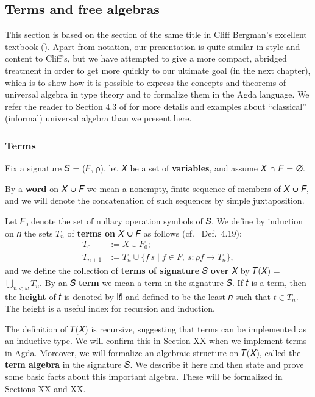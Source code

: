\documentclass[sigplan,screen]{acmart}
\begin{document}
\subsection{Terms and free algebras}\label{terms-and-free-algebras}
This section is based on the section of the same title in Cliff Bergman's excellent textbook (\cite{Bergman:2012}). Apart from notation, our presentation is quite similar in style and content to Cliff's, but we have attempted to give a more compact, abridged treatment in order to get more quickly to our ultimate goal (in the next chapter), which is to show how it is possible to express the concepts and theorems of universal algebra in type theory and to formalize them in the Agda language. We refer the reader to Section 4.3 of \cite{Bergman:2012} for more details and examples about ``classical'' (informal) universal algebra than we present here.

\subsubsection{Terms}\label{terms}
Fix a signature 𝑆 = (𝐹, ρ), let 𝑋 be a set of \textbf{variables}, and assume 𝑋 ∩ 𝐹 = ∅.

By a \textbf{word} on 𝑋 ∪ 𝐹 we mean a nonempty, finite sequence of members of 𝑋 ∪ 𝐹, and we will denote the concatenation of such sequences by simple juxtaposition.

Let 𝐹₀ denote the set of nullary operation symbols of 𝑆. We define by induction on 𝑛 the sets \(𝑇_n\) of \textbf{terms on} 𝑋 ∪ 𝐹 as follows (cf.~\cite{Bergman:2012} Def.~4.19):
\begin{align*}
  T_0 &:= X ∪ F_0;\\
  T_{n+1} &:= T_n ∪ \{ f\, s ∣ f ∈  F, \ s: ρf → T_n \},
\end{align*}
and we define the collection of \textbf{terms of signature} 𝑆 \textbf{over} 𝑋 by 𝑇(𝑋) = \(⋃_{n < ω}T_n\). By an 𝑆-\textbf{term} we mean a term in the signature 𝑆. If 𝑡 is a term, then the \textbf{height} of 𝑡 is denoted by ∣𝑡∣ and defined to be the least 𝑛 such that \(𝑡 ∈ 𝑇_n\). The height is a useful index for recursion and induction.

The definition of 𝑇(𝑋) is recursive, suggesting that terms can be implemented as an inductive type. We will confirm this in Section XX when we implement terms in Agda. Moreover, we will formalize an algebraic structure on 𝑇(𝑋), called the \textbf{term algebra} in the signature 𝑆. We describe it here and then state and prove some basic facts about this important algebra. These will be formalized in Sections XX and XX. %
\end{document}
